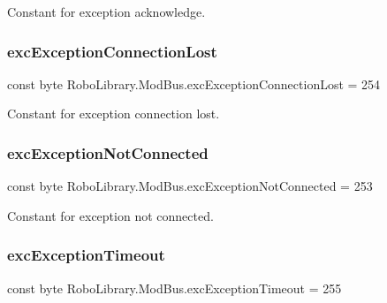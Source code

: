 Constant for exception acknowledge.

\hypertarget{class_robo_library_1_1_mod_bus_afb92b4598e76f2183460d34fa1c98b2f}{}\label{class_robo_library_1_1_mod_bus_afb92b4598e76f2183460d34fa1c98b2f} 
\subsubsection{\texorpdfstring{exc\+Exception\+Connection\+Lost}{excExceptionConnectionLost}}
{\footnotesize\ttfamily const byte Robo\+Library.\+Mod\+Bus.\+exc\+Exception\+Connection\+Lost = 254}



Constant for exception connection lost.

\hypertarget{class_robo_library_1_1_mod_bus_a0c10f797e2ff5ffacb8c8795dd2590bb}{}\label{class_robo_library_1_1_mod_bus_a0c10f797e2ff5ffacb8c8795dd2590bb} 
\subsubsection{\texorpdfstring{exc\+Exception\+Not\+Connected}{excExceptionNotConnected}}
{\footnotesize\ttfamily const byte Robo\+Library.\+Mod\+Bus.\+exc\+Exception\+Not\+Connected = 253}



Constant for exception not connected.

\hypertarget{class_robo_library_1_1_mod_bus_a0d3833f9b9c658a3298105f096ee2f28}{}\label{class_robo_library_1_1_mod_bus_a0d3833f9b9c658a3298105f096ee2f28} 
\subsubsection{\texorpdfstring{exc\+Exception\+Timeout}{excExceptionTimeout}}
{\footnotesize\ttfamily const byte Robo\+Library.\+Mod\+Bus.\+exc\+Exception\+Timeout = 255}



